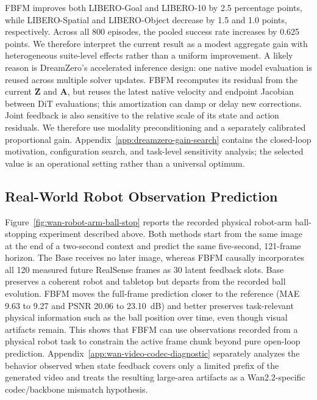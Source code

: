 FBFM improves both LIBERO-Goal and LIBERO-10 by 2.5 percentage points, while
LIBERO-Spatial and LIBERO-Object decrease by 1.5 and 1.0 points, respectively.
Across all 800 episodes, the pooled success rate increases by 0.625 points. We
therefore interpret the current result as a modest aggregate gain with
heterogeneous suite-level effects rather than a uniform improvement. A likely
reason is DreamZero's accelerated inference design: one native model evaluation
is reused across multiple solver updates. FBFM recomputes its residual from the
current $\mathbf Z$ and $\mathbf A$, but reuses the latest native velocity and
endpoint Jacobian between DiT evaluations; this amortization can damp or delay
new corrections. Joint feedback is also sensitive to the relative scale of its
state and action residuals. We therefore use modality preconditioning and a
separately calibrated proportional gain. Appendix~\ref{app:dreamzero-gain-search}
contains the closed-loop motivation, configuration search, and task-level
sensitivity analysis; the selected value is an operational setting rather than
a universal optimum.

\subsection{Real-World Robot Observation Prediction}
\label{sec:discussion:real-video}

Figure~\ref{fig:wan-robot-arm-ball-stop} reports the recorded physical
robot-arm ball-stopping experiment described above. Both methods start from the
same image at the end of a two-second context and predict the same five-second,
121-frame horizon. The Base receives no later image, whereas FBFM causally
incorporates all 120 measured future RealSense frames as 30 latent feedback
slots. Base preserves a coherent robot and tabletop but departs from the
recorded ball evolution. FBFM moves the full-frame prediction closer to the
reference (MAE 9.63 to 9.27 and PSNR 20.06 to 23.10~dB) and better preserves
task-relevant physical information such as the ball position over time, even
though visual artifacts remain. This shows that FBFM can use observations
recorded from a physical robot task to constrain the active frame chunk beyond
pure open-loop prediction. Appendix~\ref{app:wan-video-codec-diagnostic}
separately analyzes the behavior observed when state feedback covers only a
limited prefix of the generated video and treats the resulting large-area
artifacts as a Wan2.2-specific codec/backbone mismatch hypothesis.
